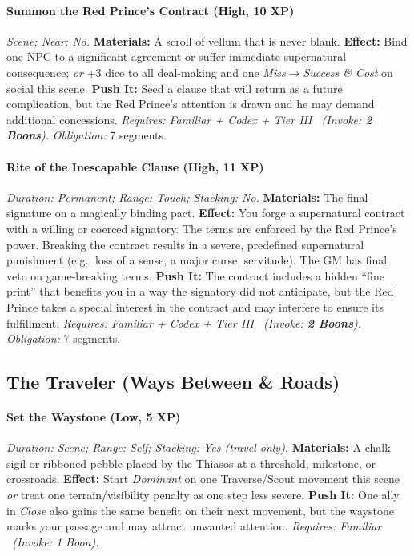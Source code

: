 \paragraph{Summon the Red Prince's Contract (High, 10 XP)} \emph{Scene; Near; No.}
\textbf{Materials:} A scroll of vellum that is never blank.
\textbf{Effect:} Bind one NPC to a significant agreement or suffer immediate supernatural consequence; \emph{or} +3 dice to all deal-making and one \emph{Miss$\rightarrow$Success \& Cost} on social this scene.
\textbf{Push It:} Seed a clause that will return as a future complication, but the Red Prince's attention is drawn and he may demand additional concessions.
\emph{Requires: Familiar + Codex + Tier III \ (\textit{Invoke:} \textbf{2 Boons}).}
\emph{Obligation:} 7 segments.

\paragraph{Rite of the Inescapable Clause (High, 11 XP)} \emph{Duration: Permanent; Range: Touch; Stacking: No.}
\textbf{Materials:} The final signature on a magically binding pact.
\textbf{Effect:} You forge a supernatural contract with a willing or coerced signatory. The terms are enforced by the Red Prince's power. Breaking the contract results in a severe, predefined supernatural punishment (e.g., loss of a sense, a major curse, servitude). The GM has final veto on game-breaking terms.
\textbf{Push It:} The contract includes a hidden ``fine print'' that benefits you in a way the signatory did not anticipate, but the Red Prince takes a special interest in the contract and may interfere to ensure its fulfillment.
\emph{Requires: Familiar + Codex + Tier III \ (\textit{Invoke:} \textbf{2 Boons}).}
\emph{Obligation:} 7 segments.

\subsection{The Traveler (Ways Between \& Roads)}
\paragraph{Set the Waystone (Low, 5 XP)} \emph{Duration: Scene; Range: Self; Stacking: Yes (travel only).}
\textbf{Materials:} A chalk sigil or ribboned pebble placed by the Thiasos at a threshold, milestone, or crossroads.
\textbf{Effect:} Start \emph{Dominant} on one Traverse/Scout movement this scene \emph{or} treat one terrain/visibility penalty as one step less severe.
\textbf{Push It:} One ally in \emph{Close} also gains the same benefit on their next movement, but the waystone marks your passage and may attract unwanted attention.
\emph{Requires: Familiar \ (\textit{Invoke:} 1 Boon).}
